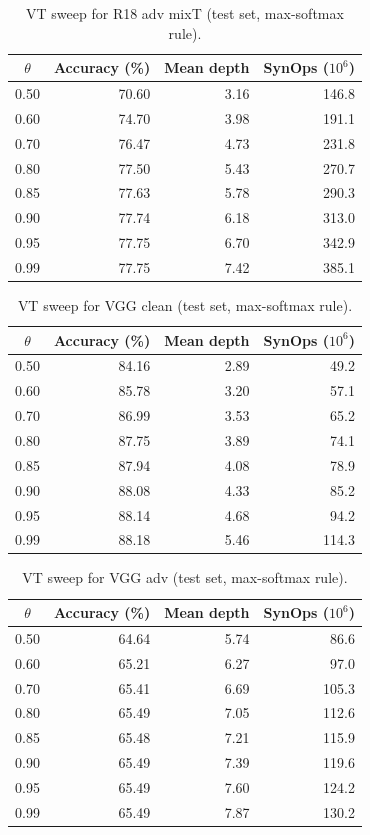\begin{table}[htbp]
\centering
\caption{VT sweep for R18 adv mixT (test set, max-softmax rule).}
\label{tab:app-vt-r18_adv_mixT}
\footnotesize
\begin{tabular}{@{}c r r r@{}}
\toprule
$\theta$ & Accuracy (\%) & Mean depth & SynOps ($10^6$) \\
\midrule
0.50 & 70.60 & 3.16 & 146.8 \\
0.60 & 74.70 & 3.98 & 191.1 \\
0.70 & 76.47 & 4.73 & 231.8 \\
0.80 & 77.50 & 5.43 & 270.7 \\
0.85 & 77.63 & 5.78 & 290.3 \\
0.90 & 77.74 & 6.18 & 313.0 \\
0.95 & 77.75 & 6.70 & 342.9 \\
0.99 & 77.75 & 7.42 & 385.1 \\
\bottomrule
\end{tabular}
\end{table}

\begin{table}[htbp]
\centering
\caption{VT sweep for VGG clean (test set, max-softmax rule).}
\label{tab:app-vt-vgg_clean_T8}
\footnotesize
\begin{tabular}{@{}c r r r@{}}
\toprule
$\theta$ & Accuracy (\%) & Mean depth & SynOps ($10^6$) \\
\midrule
0.50 & 84.16 & 2.89 & 49.2 \\
0.60 & 85.78 & 3.20 & 57.1 \\
0.70 & 86.99 & 3.53 & 65.2 \\
0.80 & 87.75 & 3.89 & 74.1 \\
0.85 & 87.94 & 4.08 & 78.9 \\
0.90 & 88.08 & 4.33 & 85.2 \\
0.95 & 88.14 & 4.68 & 94.2 \\
0.99 & 88.18 & 5.46 & 114.3 \\
\bottomrule
\end{tabular}
\end{table}

\begin{table}[htbp]
\centering
\caption{VT sweep for VGG adv (test set, max-softmax rule).}
\label{tab:app-vt-vgg_adv_T8}
\footnotesize
\begin{tabular}{@{}c r r r@{}}
\toprule
$\theta$ & Accuracy (\%) & Mean depth & SynOps ($10^6$) \\
\midrule
0.50 & 64.64 & 5.74 & 86.6 \\
0.60 & 65.21 & 6.27 & 97.0 \\
0.70 & 65.41 & 6.69 & 105.3 \\
0.80 & 65.49 & 7.05 & 112.6 \\
0.85 & 65.48 & 7.21 & 115.9 \\
0.90 & 65.49 & 7.39 & 119.6 \\
0.95 & 65.49 & 7.60 & 124.2 \\
0.99 & 65.49 & 7.87 & 130.2 \\
\bottomrule
\end{tabular}
\end{table}

